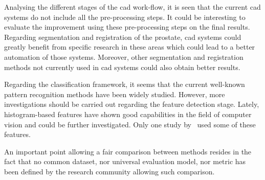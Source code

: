 Analysing the different stages of the \ac{cad} work-flow, it is seen that the current \ac{cad} systems do not include all the pre-processing steps.
It could be interesting to evaluate the improvement using these pre-processing steps on the final results.
Regarding segmentation and registration of the prostate, \ac{cad} systems could greatly benefit from specific research in these areas which could lead to a better automation of those systems.
Moreover, other segmentation and registration methods not currently used in \ac{cad} systems could also obtain better results.

Regarding the classification framework, it seems that the current well-known pattern recognition methods have been widely studied.
However, more investigations should be carried out regarding the feature detection stage.
Lately, histogram-based features have shown good capabilities in the field of computer vision and could be further investigated.
Only one study by~\cite{Liu2013} used some of these features.

An important point allowing a fair comparison between methods resides in the fact that no common dataset, nor universal evaluation model, nor metric has been defined by the research community allowing such comparison.


